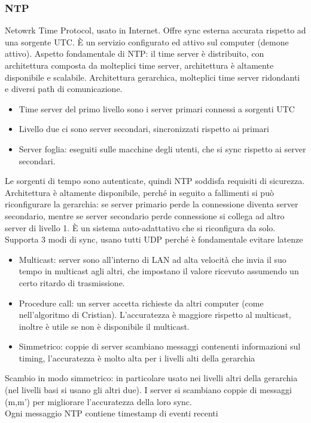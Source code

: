 \documentclass{article}
\begin{document}
\subsubsection{NTP}
Netowrk Time Protocol, usato in Internet. Offre sync esterna accurata rispetto ad una sorgente UTC. È un servizio configurato ed attivo sul computer (demone attivo). Aspetto fondamentale di NTP: il time server è distribuito, con architettura composta da molteplici time server, architettura è altamente disponibile e scalabile. Architettura gerarchica, molteplici time server ridondanti e diversi path di comunicazione.
\begin{itemize}
\item Time server del primo livello sono i server primari connessi a sorgenti UTC
\item Livello due ci sono server secondari, sincronizzati rispetto ai primari
\item Server foglia: eseguiti sulle macchine degli utenti, che si sync rispetto ai server secondari.
\end{itemize}
Le sorgenti di tempo sono autenticate, quindi NTP soddisfa requisiti di sicurezza. Architettura è altamente disponibile, perché in seguito a fallimenti si può riconfigurare la gerarchia: se server primario perde la connessione diventa server secondario, mentre se server secondario perde connessione si collega ad altro server di livello 1. È un sistema auto-adattativo che si riconfigura da solo.\\ Supporta 3 modi di sync, usano tutti UDP perché è fondamentale evitare latenze
\begin{itemize}
\item Multicast: server sono all'interno di LAN ad alta velocità che invia il suo tempo in multicast agli altri, che impostano il valore ricevuto assumendo un certo ritardo di trasmissione.
\item Procedure call: un server accetta richieste da altri computer (come nell'algoritmo di Cristian). L'accuratezza è maggiore rispetto al multicast, inoltre   è utile se non è disponibile il multicast.
\item Simmetrico: coppie di server scambiano messaggi contenenti informazioni sul timing, l'accuratezza è molto alta per i livelli alti della gerarchia
\end{itemize}
Scambio in modo simmetrico: in particolare usato nei livelli altri della gerarchia (nel livelli basi si usano gli altri due). I server si scambiano coppie di messaggi (m,m') per migliorare l'accuratezza della loro sync.\\ Ogni messaggio NTP contiene timestamp di eventi recenti
\end{document}
